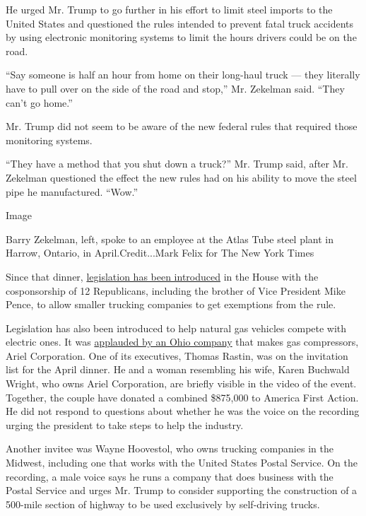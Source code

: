 He urged Mr. Trump to go further in his effort to limit steel imports to
the United States and questioned the rules intended to prevent fatal
truck accidents by using electronic monitoring systems to limit the
hours drivers could be on the road.

``Say someone is half an hour from home on their long-haul truck ---
they literally have to pull over on the side of the road and stop,'' Mr.
Zekelman said. ``They can't go home.''

Mr. Trump did not seem to be aware of the new federal rules that
required those monitoring systems.

``They have a method that you shut down a truck?'' Mr. Trump said, after
Mr. Zekelman questioned the effect the new rules had on his ability to
move the steel pipe he manufactured. ``Wow.''

Image

Barry Zekelman, left, spoke to an employee at the Atlas Tube steel plant
in Harrow, Ontario, in April.Credit...Mark Felix for The New York Times

Since that dinner,
\href{https://www.congress.gov/bill/116th-congress/house-bill/1697?q=\%7B\%22search\%22\%3A\%5B\%22S.+1463\%22\%5D\%7D\&s=1\&r=51}{legislation
has been introduced} in the House with the cosponsorship of 12
Republicans, including the brother of Vice President Mike Pence, to
allow smaller trucking companies to get exemptions from the rule.

Legislation has also been introduced to help natural gas vehicles
compete with electric ones. It was
\href{https://www.prnewswire.com/news-releases/vng-applauds-legislation-ushering-in-new-era-for-light-duty-natural-gas-vehicles-300683483.html}{applauded
by an Ohio company} that makes gas compressors, Ariel Corporation. One
of its executives, Thomas Rastin, was on the invitation list for the
April dinner. He and a woman resembling his wife, Karen Buchwald Wright,
who owns Ariel Corporation, are briefly visible in the video of the
event. Together, the couple have donated a combined \$875,000 to America
First Action. He did not respond to questions about whether he was the
voice on the recording urging the president to take steps to help the
industry.

Another invitee was Wayne Hoovestol, who owns trucking companies in the
Midwest, including one that works with the United States Postal Service.
On the recording, a male voice says he runs a company that does business
with the Postal Service and urges Mr. Trump to consider supporting the
construction of a 500-mile section of highway to be used exclusively by
self-driving trucks.

